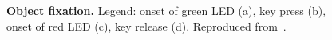 \begin{figure}[htbp]
	\centering

	\caption[Canonical neuron: object fixation]{\textbf{Object fixation.}
    Legend: onset of green LED (a), key press (b), onset of red LED (c),
	key release (d).
	Reproduced from~\citet{murata.etal:1997}.}	
	\label{fig:actions:F5:murata:a:3}
\end{figure}
